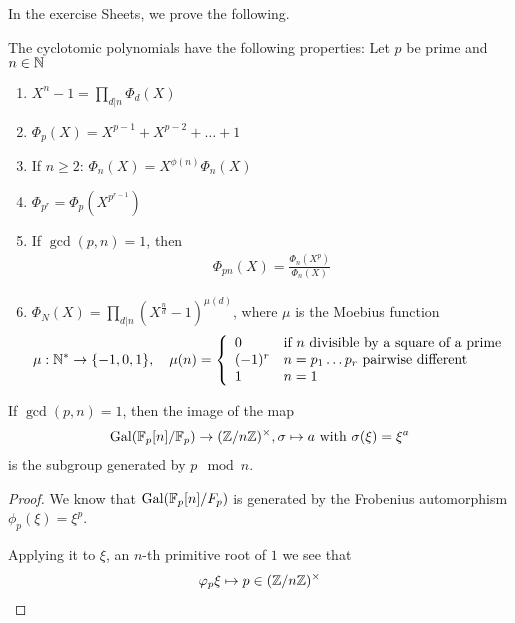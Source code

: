 In the exercise Sheets, we prove the following.
\begin{prop}[]\label{prop:4-23}
The cyclotomic polynomials have the following properties:
Let $p$ be prime and $n \in\mathbb{N}$
\begin{enumerate}
  \item $X^{n}-1 = \prod_{d|n}\Phi_d(X)$
  \item $\Phi_p(X) = X^{p-1} + X^{p-2} + \ldots + 1$
  \item If $n \geq 2$: $\Phi_n(X) = X^{\phi(n)}\Phi_n(X)$
  \item $\Phi_{p^{r}} = \Phi_p(X^{p^{r-1}})$
  \item If $\gcd(p,n)=1$, then
    \begin{align*}
      \Phi_{pn}(X) = \frac{\Phi_n(X^{p})}{\Phi_n(X)}
    \end{align*}
  \item $\Phi_N(X) = \prod_{d|n}(X^{\frac{n}{d}} - 1)^{\mu(d)}$, where $\mu$ is the Moebius function
    \begin{align*}
      \mu: \mathbb{N}^{\ast} \to  \{-1,0,1\}, \quad \mu(n) = \left\{\begin{array}{ll}
        0 & \text{if $n$ divisible by a square of a prime}\\
        (-1)^{r} & n= p_1 \dots p_r \text{ pairwise different}\\
        1 & n=1
      \end{array} \right.
    \end{align*}
\end{enumerate}
\end{prop}

\begin{thm}[]\label{thm:4-30}
  If $\gcd(p,n)=1$, then the image of the map
  \begin{align*}
    \operatorname{Gal}(\mathbb{F}_p[n]/\mathbb{F}_p) \to (\mathbb{Z}/n\mathbb{Z})^{\times}, \sigma \mapsto  a \text{ with } \sigma(\xi) = \xi^{a}
  \end{align*}
  is the subgroup generated by $p \mod n$.
\end{thm}
\begin{proof}
  We know that $\operatorname{Gal}(\mathbb{F}_p[n]/F_p)$ is generated by the Frobenius automorphism $\phi_p(\xi) = \xi^{p}$.

  Applying it to $\xi$, an $n$-th primitive root of $1$ we see that
  \begin{align*}
    \varphi_p \xi \mapsto p \in (\mathbb{Z}/n\mathbb{Z})^{\times}
  \end{align*}
\end{proof}
